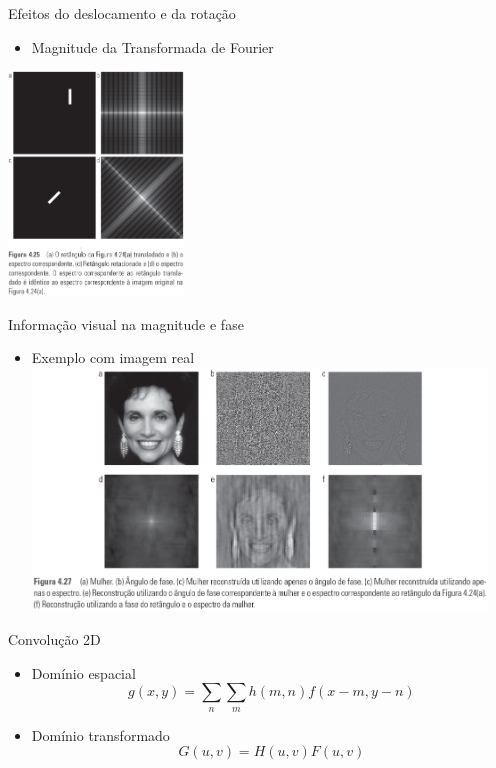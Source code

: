       \begin{slide}[toc=]{Efeitos do deslocamento e da rotação}
         \begin{itemize}[type=1]
            \item Magnitude da Transformada de Fourier
         \end{itemize}
	      \begin{center}
               \includegraphics[width=0.35\textwidth]{figs/fig0425}
	      \end{center}
      \end{slide}
      
      \begin{slide}[toc=]{Informação visual na magnitude e fase}
         \begin{itemize}[type=1]
            \item Exemplo com imagem real
               \includegraphics[width=0.95\textwidth]{figs/fig0427}
         \end{itemize}
      \end{slide}
      
      \begin{slide}[toc=]{Convolução 2D}
         \begin{itemize}[type=1]
            \item Domínio espacial
            \begin{equation*}
               g(x,y) = \sum_n\sum_m h(m,n)f(x-m,y-n)
            \end{equation*}
            \item Domínio transformado
            \begin{equation*}
               G(u,v) = H(u,v)F(u,v)
            \end{equation*}
         \end{itemize}
      \end{slide}
   

